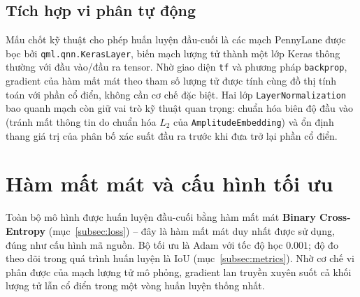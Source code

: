 \subsection{Tích hợp vi phân tự động}
Mấu chốt kỹ thuật cho phép huấn luyện đầu-cuối là các mạch PennyLane được bọc bởi \texttt{qml.qnn.KerasLayer}, biến mạch lượng tử thành một lớp Keras thông thường với đầu vào/đầu ra tensor. Nhờ giao diện \texttt{tf} và phương pháp \texttt{backprop}, gradient của hàm mất mát theo tham số lượng tử được tính cùng đồ thị tính toán với phần cổ điển, không cần cơ chế đặc biệt. Hai lớp \texttt{LayerNormalization} bao quanh mạch còn giữ vai trò kỹ thuật quan trọng: chuẩn hóa biên độ đầu vào (tránh mất thông tin do chuẩn hóa $L_2$ của \texttt{AmplitudeEmbedding}) và ổn định thang giá trị của phân bố xác suất đầu ra trước khi đưa trở lại phần cổ điển.

\section{Hàm mất mát và cấu hình tối ưu}
Toàn bộ mô hình được huấn luyện đầu-cuối bằng hàm mất mát \textbf{Binary Cross-Entropy} (mục~\ref{subsec:loss}) -- đây là hàm mất mát duy nhất được sử dụng, đúng như cấu hình mã nguồn. Bộ tối ưu là Adam \cite{kingma2015adam} với tốc độ học $0.001$; độ đo theo dõi trong quá trình huấn luyện là IoU (mục~\ref{subsec:metrics}). Nhờ cơ chế vi phân được của mạch lượng tử mô phỏng, gradient lan truyền xuyên suốt cả khối lượng tử lẫn cổ điển trong một vòng huấn luyện thống nhất.

